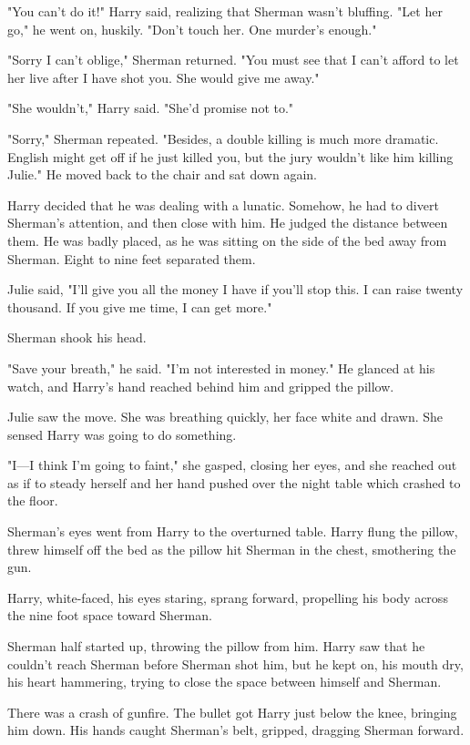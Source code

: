 \documentclass{novel}
\begin{document}
"You can't do it!" Harry said, realizing that Sherman wasn't bluffing. "Let her go," he went on, huskily. "Don't touch her. One murder's enough."

"Sorry I can't oblige," Sherman returned. "You must see that I can't afford to let her live after I have shot you. She would give me away."

"She wouldn't," Harry said. "She'd promise not to."

"Sorry," Sherman repeated. "Besides, a double killing is much more dramatic. English might get off if he just killed you, but the jury wouldn't like him killing Julie." He moved back to the chair and sat down again.

Harry decided that he was dealing with a lunatic. Somehow, he had to divert Sherman's attention, and then close with him. He judged the distance between them. He was badly placed, as he was sitting on the side of the bed away from Sherman. Eight to nine feet separated them.

Julie said, "I'll give you all the money I have if you'll stop this. I can raise twenty thousand. If you give me time, I can get more."

Sherman shook his head.

"Save your breath," he said. "I'm not interested in money." He glanced at his watch, and Harry's hand reached behind him and gripped the pillow.

Julie saw the move. She was breathing quickly, her face white and drawn. She sensed Harry was going to do something.

"I—I think I'm going to faint," she gasped, closing her eyes, and she reached out as if to steady herself and her hand pushed over the night table which crashed to the floor.

Sherman's eyes went from Harry to the overturned table. Harry flung the pillow, threw himself off the bed as the pillow hit Sherman in the chest, smothering the gun.

Harry, white-faced, his eyes staring, sprang forward, propelling his body across the nine foot space toward Sherman.

Sherman half started up, throwing the pillow from him. Harry saw that he couldn't reach Sherman before Sherman shot him, but he kept on, his mouth dry, his heart hammering, trying to close the space between himself and Sherman.

There was a crash of gunfire. The bullet got Harry just below the knee, bringing him down. His hands caught Sherman's belt, gripped, dragging Sherman forward.
\end{document}
